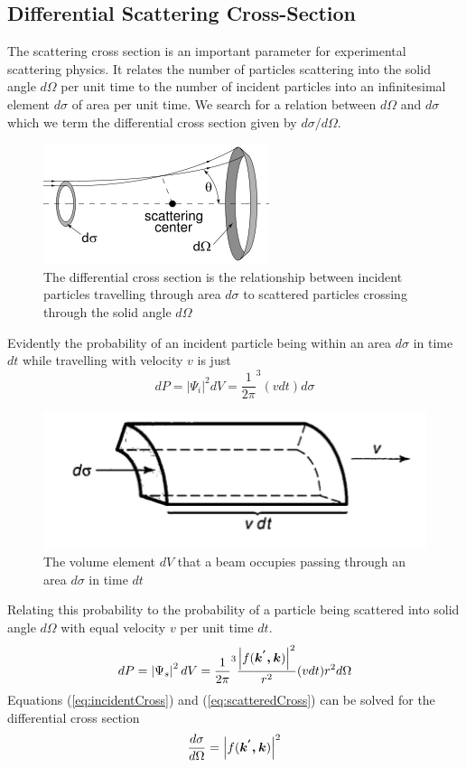 \subsection{Differential Scattering Cross-Section}
The scattering cross section is an important parameter for experimental scattering physics. It relates the number of particles scattering into the solid angle $d\Omega$ per unit time to the number of incident particles into an infinitesimal element $d\sigma$ of area per unit time. We search for a relation between $d\Omega$ and $d\sigma$ which we term the differential cross section given by $d\sigma/d\Omega$.
\begin{figure}[ht!]
\centering
\includegraphics[scale=1.0]{Figures/scatteringCrossSection.png}
\caption{The differential cross section is the relationship between incident particles travelling through area $d\sigma$ to scattered particles crossing through the solid angle $d\Omega$}
\label{fig:scatteringCrossSection}
\end{figure}
Evidently the probability of an incident particle being within an area $d\sigma$ in time $dt$ while travelling with velocity $v$ is just 
\begin{equation}
dP = \left|\Psi_i\right|^2 dV  = \frac{1}{2\pi}^3 (vdt)d\sigma
\label{eq:incidentCross}
\end{equation}

\begin{figure}[ht!]
\centering
\includegraphics[scale=0.7]{Figures/incidentBeam.png}
\caption{The volume element $dV$ that a beam occupies passing through an area $d\sigma$ in time $dt$}
\label{fig:incidentBeam}
\end{figure}

Relating this probability to the probability of a particle being scattered into solid angle $d\Omega$ with equal velocity $v$ per unit time $dt$. 
\begin{equation}
\label{eq:scatteredCross}
dP=\left|\Psi_s\right|^2dV = \frac{1}{2\pi}^3 \frac{\left|f(\mbox{\boldmath$k^{'},k$})\right|^2}{r^2}(vdt)r^2 d\Omega
\end{equation}
Equations (\ref{eq:incidentCross}) and (\ref{eq:scatteredCross}) can be solved for the differential cross section 
\begin{equation}
\label{eq:differentialCrossSection}
\frac{d\sigma}{d\Omega}= \left|f(\mbox{\boldmath$k^{'},k$})\right|^2
\end{equation}

